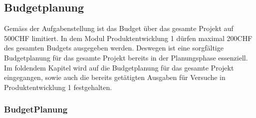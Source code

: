 \documentclass[main.tex]{subfiles} %
\begin{document}
\begin{landscape}
\subsection{Budgetplanung}

Gemäss der Aufgabenstellung ist das Budget über das gesamte Projekt auf 500CHF limitiert.
In dem Modul Produktentwicklung 1 dürfen maximal 200CHF des gesamten Budgets ausgegeben werden.
Deswegen ist eine sorgfältige Budgetplanung für das gesamte Projekt bereits in der Planungsphase
essenziell. Im foldendem Kapitel wird auf die Budgetplanung für das gesamte Projekt eingegangen,
sowie auch die bereits getätigten Ausgaben für Versuche in Produktentwicklung 1 festgehalten.

\subsubsection{BudgetPlanung}



\end{landscape}
\end{document}
